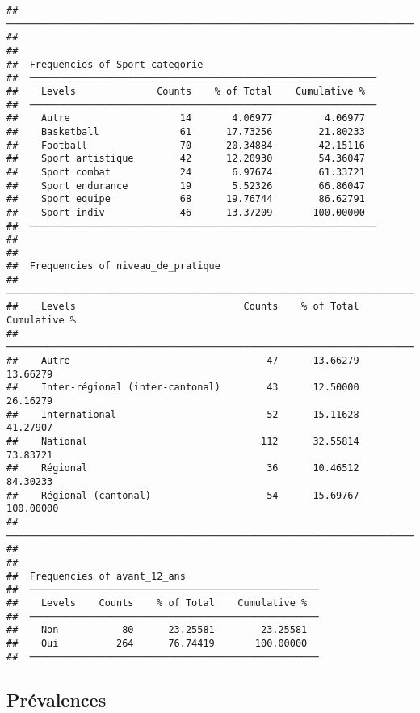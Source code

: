 \documentclass[
]{article}
\begin{document}
\begin{verbatim}
##  ────────────────────────────────────────────────────────────────────────────────── 
## 
## 
##  Frequencies of Sport_categorie                               
##  ──────────────────────────────────────────────────────────── 
##    Levels              Counts    % of Total    Cumulative %   
##  ──────────────────────────────────────────────────────────── 
##    Autre                   14       4.06977         4.06977   
##    Basketball              61      17.73256        21.80233   
##    Football                70      20.34884        42.15116   
##    Sport artistique        42      12.20930        54.36047   
##    Sport combat            24       6.97674        61.33721   
##    Sport endurance         19       5.52326        66.86047   
##    Sport equipe            68      19.76744        86.62791   
##    Sport indiv             46      13.37209       100.00000   
##  ──────────────────────────────────────────────────────────── 
## 
## 
##  Frequencies of niveau_de_pratique                                           
##  ─────────────────────────────────────────────────────────────────────────── 
##    Levels                             Counts    % of Total    Cumulative %   
##  ─────────────────────────────────────────────────────────────────────────── 
##    Autre                                  47      13.66279        13.66279   
##    Inter-régional (inter-cantonal)        43      12.50000        26.16279   
##    International                          52      15.11628        41.27907   
##    National                              112      32.55814        73.83721   
##    Régional                               36      10.46512        84.30233   
##    Régional (cantonal)                    54      15.69767       100.00000   
##  ─────────────────────────────────────────────────────────────────────────── 
## 
## 
##  Frequencies of avant_12_ans                        
##  ────────────────────────────────────────────────── 
##    Levels    Counts    % of Total    Cumulative %   
##  ────────────────────────────────────────────────── 
##    Non           80      23.25581        23.25581   
##    Oui          264      76.74419       100.00000   
##  ──────────────────────────────────────────────────
\end{verbatim}

\hypertarget{pruxe9valences}{%
\subsection{Prévalences}\label{pruxe9valences}}
\end{document}
